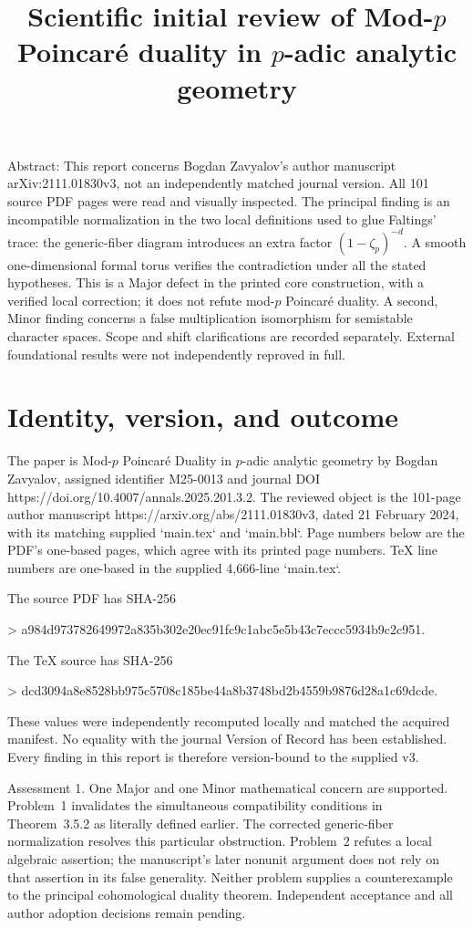 \documentclass[10pt]{article}
\title{Scientific initial review of
Mod-\(p\) Poincaré duality in \(p\)-adic analytic geometry}
\author{}
\date{}
\begin{document}
\maketitle
Abstract: This report concerns Bogdan Zavyalov’s author manuscript arXiv:2111.01830v3, not an independently matched journal version. All 101 source PDF pages were read and visually inspected. The principal finding is an incompatible normalization in the two local definitions used to glue Faltings’ trace: the generic-fiber diagram introduces an extra factor \((1-\zeta_p)^{-d}\). A smooth one-dimensional formal torus verifies the contradiction under all the stated hypotheses. This is a Major defect in the printed core construction, with a verified local correction; it does not refute mod-\(p\) Poincaré duality. A second, Minor finding concerns a false multiplication isomorphism for semistable character spaces. Scope and shift clarifications are recorded separately. External foundational results were not independently reproved in full.\par
\section*{Identity, version, and outcome}
The paper is Mod-\(p\) Poincaré Duality in \(p\)-adic analytic geometry by Bogdan Zavyalov, assigned identifier M25-0013 and journal DOI https://doi.org/10.4007/annals.2025.201.3.2. The reviewed object is the 101-page author manuscript https://arxiv.org/abs/2111.01830v3, dated 21 February 2024, with its matching supplied `main.tex` and `main.bbl`. Page numbers below are the PDF’s one-based pages, which agree with its printed page numbers. TeX line numbers are one-based in the supplied 4,666-line `main.tex`.\par
The source PDF has SHA-256\par
> a984d973782649972a835b302e20ec91fc9c1abc5e5b43c7eccc5934b9c2c951.\par
The TeX source has SHA-256\par
> dcd3094a8e8528bb975c5708c185be44a8b3748bd2b4559b9876d28a1c69dcde.\par
These values were independently recomputed locally and matched the acquired manifest. No equality with the journal Version of Record has been established. Every finding in this report is therefore version-bound to the supplied v3.\par
Assessment 1.  One Major and one Minor mathematical concern are supported. Problem 1 invalidates the simultaneous compatibility conditions in Theorem 3.5.2 as literally defined earlier. The corrected generic-fiber normalization resolves this particular obstruction. Problem 2 refutes a local algebraic assertion; the manuscript’s later nonunit argument does not rely on that assertion in its false generality. Neither problem supplies a counterexample to the principal cohomological duality theorem. Independent acceptance and all author adoption decisions remain pending.\par
\end{document}

